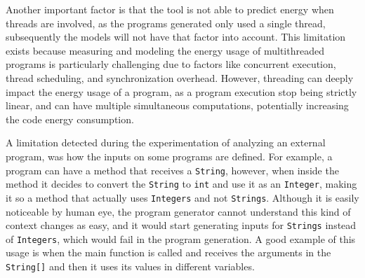 Another important factor is that the tool is not able to predict energy when threads are involved, as the programs generated only used a single thread, subsequently the models will not have that factor into account. This limitation exists because measuring and modeling the energy usage of multithreaded programs is particularly challenging due to factors like concurrent execution, thread scheduling, and synchronization overhead. However, threading can deeply impact the energy usage of a program, as a program execution stop being strictly linear, and can have multiple simultaneous computations, potentially increasing the code energy consumption.


A limitation detected during the experimentation of analyzing an external program, was how the inputs on some programs are defined. For example, a program can have a method that receives a \texttt{String}, however, when inside the method it decides to convert the \texttt{String} to \texttt{int} and use it as an \texttt{Integer}, making it so a method that actually uses \texttt{Integers} and not \texttt{Strings}. Although it is easily noticeable by human eye, the program generator cannot understand this kind of context changes as easy, and it would start generating inputs for \texttt{Strings} instead of \texttt{Integers}, which would fail in the program generation. A good example of this usage is when the main function is called and receives the arguments in the \texttt{String[]} and then it uses its values in different variables.





